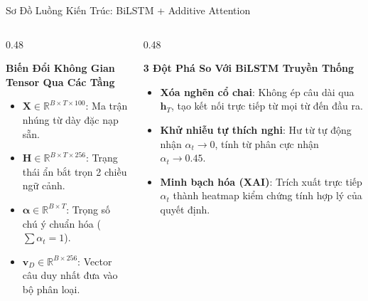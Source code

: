\documentclass[aspectratio=169, 10pt]{beamer}
\begin{document}
\begin{frame}{Sơ Đồ Luồng Kiến Trúc: BiLSTM + Additive Attention}
  \vspace{0.25cm}
  \begin{columns}[T, onlytextwidth]
    \begin{column}{0.48\textwidth}
      \begin{block}{\small\textbf{Biến Đổi Không Gian Tensor Qua Các Tầng}}
        \fontsize{7.5}{9.5}\selectfont
        \begin{itemize}\setlength{\itemsep}{0.2em}
          \item $\mathbf{X} \in \mathbb{R}^{B \times T \times 100}$: Ma trận nhúng từ dày đặc nạp sẵn.
          \item $\mathbf{H} \in \mathbb{R}^{B \times T \times 256}$: Trạng thái ẩn bắt trọn 2 chiều ngữ cảnh.
          \item $\boldsymbol{\alpha} \in \mathbb{R}^{B \times T}$: Trọng số chú ý chuẩn hóa ($\sum \alpha_t = 1$).
          \item $\mathbf{v}_D \in \mathbb{R}^{B \times 256}$: Vector câu duy nhất đưa vào bộ phân loại.
        \end{itemize}
      \end{block}
    \end{column}
    \hfill
    \begin{column}{0.48\textwidth}
      \begin{exampleblock}{\small\textbf{3 Đột Phá So Với BiLSTM Truyền Thống}}
        \fontsize{7.5}{9.5}\selectfont
        \begin{itemize}\setlength{\itemsep}{0.2em}
          \item \textbf{Xóa nghẽn cổ chai}: Không ép câu dài qua $\mathbf{h}_T$, tạo kết nối trực tiếp từ mọi từ đến đầu ra.
          \item \textbf{Khử nhiễu tự thích nghi}: Hư từ tự động nhận $\alpha_t \to 0$, tính từ phân cực nhận $\alpha_t \to 0.45$.
          \item \textbf{Minh bạch hóa (XAI)}: Trích xuất trực tiếp $\alpha_t$ thành heatmap kiểm chứng tính hợp lý của quyết định.
        \end{itemize}
      \end{exampleblock}
    \end{column}
  \end{columns}
\end{frame}
\end{document}
